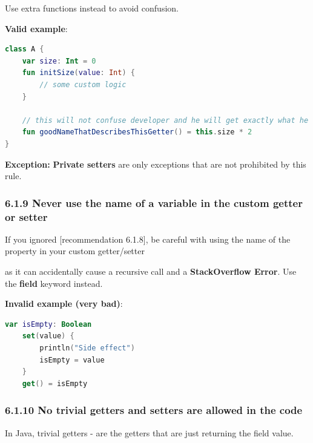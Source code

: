 {{{{{{{{{{{{{{{{{{{{Use extra functions instead to avoid confusion.







\textbf{Valid example}:

\begin{lstlisting}[language=Kotlin]
class A {
    var size: Int = 0
    fun initSize(value: Int) {
        // some custom logic
    }
    
    // this will not confuse developer and he will get exactly what he expects    
    fun goodNameThatDescribesThisGetter() = this.size * 2
}
\end{lstlisting}


\textbf{Exception:} \textbf{Private setters} are only exceptions that are not prohibited by this rule.



\subsubsection*{\textbf{6.1.9 Never use the name of a variable in the custom getter or setter}}
\leavevmode\newline

\label{sec:6.1.9}

If you ignored [recommendation 6.1.8], be careful with using the name of the property in your custom getter/setter

as it can accidentally cause a recursive call and a \textbf{StackOverflow Error}. Use the \textbf{field} keyword instead.



\textbf{Invalid example (very bad)}:

\begin{lstlisting}[language=Kotlin]
var isEmpty: Boolean
    set(value) {
        println("Side effect")
        isEmpty = value
    }
    get() = isEmpty
\end{lstlisting}


\subsubsection*{\textbf{6.1.10 No trivial getters and setters are allowed in the code}}
\leavevmode\newline

\label{sec:6.1.10}

In Java, trivial getters - are the getters that are just returning the field value.

}}}}}}}}}}}}}}}}}}}}
